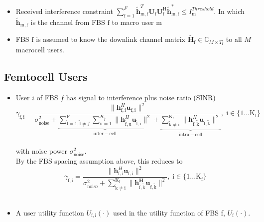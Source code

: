 \documentclass[12pt,a4paper]{report}
\begin{document}
\begin{itemize}
\item 
	Received interference constraint
	$\sum^F_{\text{f}=1} \mathbf{\tilde{h}}_{\mathrm{m,f}}^T  \mathbf{U_{\mathrm{f}}} 						
	\mathbf{U_{\mathrm{f}}^{\mathrm{H}}} \mathbf{\tilde{h}_{\mathrm{m,f}}^*} \leq I^{Threshold}		
	_{\mathrm{m}} $. In which $\mathbf{\tilde{h}}_{\mathrm{m,f}}$ is the channel from FBS $\text{f}$ to macro user $\text{m}$

\item 
	FBS $\text{f}$ is assumed to know the downlink channel matrix $\tilde{\mathbf{H}_{\mathrm{f}}} \in \mathbb{C}_{M \times T_{\text{f}}}$ to all $M$ macrocell users.
\\
\end{itemize}

\subsection{Femtocell Users}
\begin{itemize}

\item User $i$ of FBS $f$ has signal to interference plus noise ratio (SINR)
	\begin{equation*}
	\gamma_{\mathrm{f,i}} = \frac{\|\mathbf{h}^H_{\mathrm{f,i}}\mathbf{u}_{\mathrm{f,i}}\|^2}
	{\sigma^2_{\text{noise}}   +
	\underbrace{
	 \sum_{\mathrm{\tilde{f}}=1,\mathrm{\tilde{f}}\neq f}^{\mathrm{F}} \sum_{\mathrm{u=1}}^{K_{\mathrm{\tilde{f}}}}
	\|\mathbf{h}^H_{\mathrm{\tilde{f},u}}\mathbf{u}_{\mathrm{\tilde{f},i}}\|^2}_{\mathrm{inter-cell}}
	 + 
	 \underbrace{
	 \sum_{\mathrm{\tilde{k}\neq i}}^{\mathrm{K_f}}
	 \|\mathbf{h}^H_{\mathrm{f,\tilde{k}}}\mathbf{u}_{\mathrm{f,\tilde{k}}}\|^2}_{\mathrm{intra-cell}}},
	  \; \mathrm{i \in \{1 ... K_f\}}
	  \end{equation*}
\\
with noise power $\sigma^2_{\text{noise}}.$
\\

By the FBS spacing assumption above, this reduces to
	\begin{equation*}
	\gamma_{\mathrm{f,i}} = \frac{\|\mathbf{h}^H_{\mathrm{f,i}}\mathbf{u}_{\mathrm{f,i}}\|^2}
	{\sigma^2_{\text{noise}} 
	 + \sum_{\mathrm{\tilde{k}\neq i}}^{\mathrm{K_f}}
	  \|\mathbf{h^H_{\mathrm{f,\tilde{k}}}u_{\mathrm{f,\tilde{k}}}}\|^2},
	  \; \mathrm{i \in \{1 ... K_f\}}
	\end{equation*}
\\
\item 
A user utility function $U_{\mathrm{f,i}}(\cdot)$ used in the utility function of FBS f, $U_{\mathrm{f}}(\cdot)$. 

\end{itemize}
\end{document}
